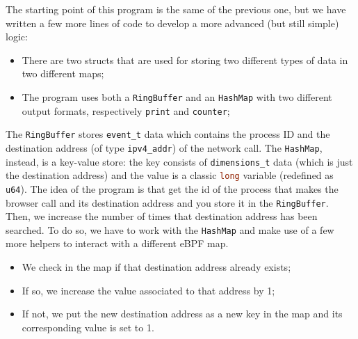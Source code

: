 The starting point of this program is the same of the previous one, but we have written a few more lines of code to develop a more advanced (but still simple) logic:

\begin{itemize}
	\item 
		There are two structs that are used for storing two different types of data in two different maps;
	\item 
		The program uses both a \colorbox{backcolour}{\lstinline[style=highlight, language=bash]|RingBuffer|} and an \colorbox{backcolour}{\lstinline[style=highlight, language=bash]|HashMap|} with two different output formats, respectively \colorbox{backcolour}{\lstinline[style=highlight, language=bash]|print|} and \colorbox{backcolour}{\lstinline[style=highlight, language=bash]|counter|};
\end{itemize}

The \colorbox{backcolour}{\lstinline[style=highlight, language=bash]|RingBuffer|} stores \colorbox{backcolour}{\lstinline[style=cstyle, language=C]|event_t|} data which contains the process ID and the destination address (of type \colorbox{backcolour}{\lstinline[style=cstyle, language=C]|ipv4_addr|}) of the network call.
The \colorbox{backcolour}{\lstinline[style=highlight, language=bash]|HashMap|}, instead, is a key-value store: the key consists of \colorbox{backcolour}{\lstinline[style=cstyle, language=C]|dimensions_t|} data (which is just the destination address) and the value is a classic \colorbox{backcolour}{\lstinline[style=cstyle, language=C]|long|} variable (redefined as \colorbox{backcolour}{\lstinline[style=cstyle, language=C]|u64|}).
The idea of the program is that get the id of the process that makes the browser call and its destination address and you store it in the \colorbox{backcolour}{\lstinline[style=highlight, language=bash]|RingBuffer|}.
Then, we increase the number of times that destination address has been searched.
To do so, we have to work with the \colorbox{backcolour}{\lstinline[style=highlight, language=bash]|HashMap|} and make use of a few more helpers to interact with a different eBPF map. 

\begin{itemize}
	\item 
		We check in the map if that destination address already exists;
	\item 
		If so, we increase the value associated to that address by 1;
	\item 
		If not, we put the new destination address as a new key in the map and its corresponding value is set to 1.
\end{itemize}

